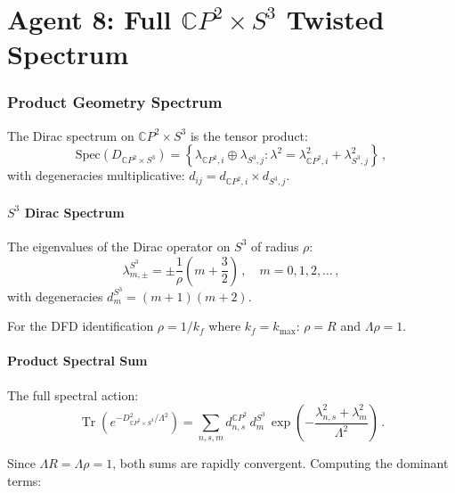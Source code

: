 \documentclass[11pt,a4paper]{article}
\newcommand{\Tr}{\operatorname{Tr}}
\newcommand{\CP}{\mathbb{C}P}
\begin{document}
\part{Agent 8: Full $\CP^2 \times S^3$ Twisted Spectrum}
\label{part:cp2s3}

\section{Product Geometry Spectrum}

The Dirac spectrum on $\CP^2 \times S^3$ is the tensor product:
\begin{equation}
\mathrm{Spec}(D_{\CP^2 \times S^3}) = \left\{\lambda_{\CP^2,i} \oplus \lambda_{S^3,j} : \lambda^2 = \lambda_{\CP^2,i}^2 + \lambda_{S^3,j}^2\right\}\,,
\end{equation}
with degeneracies multiplicative: $d_{ij} = d_{\CP^2,i} \times d_{S^3,j}$.

\subsection{$S^3$ Dirac Spectrum}

The eigenvalues of the Dirac operator on $S^3$ of radius $\rho$:
\begin{equation}
\lambda_{m,\pm}^{S^3} = \pm\frac{1}{\rho}\left(m + \frac{3}{2}\right)\,,\quad m = 0, 1, 2, \ldots\,,
\end{equation}
with degeneracies $d_m^{S^3} = (m+1)(m+2)$.

For the DFD identification $\rho = 1/k_f$ where $k_f = k_{\max}$: $\rho = R$ and $\Lambda\rho = 1$.

\subsection{Product Spectral Sum}

The full spectral action:
\begin{equation}
\Tr(e^{-D^2_{\CP^2 \times S^3}/\Lambda^2}) = \sum_{n,s,m} d_{n,s}^{\CP^2}\,d_m^{S^3}\,\exp\left(-\frac{\lambda_{n,s}^2 + \lambda_m^2}{\Lambda^2}\right)\,.
\end{equation}

Since $\Lambda R = \Lambda\rho = 1$, both sums are rapidly convergent. Computing the dominant terms:
\end{document}
